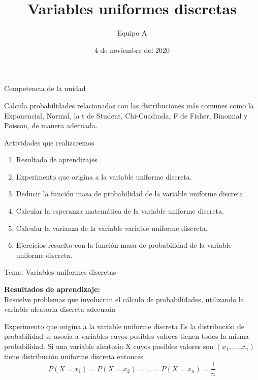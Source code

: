 \documentclass[11pt]{beamer}
\author{Equipo A}
\date{4 de noviembre del 2020}
\title{Variables uniformes discretas}
\institute{Universidad Autónoma de Yucatan}
\begin{document}
\begin{frame}
\titlepage
\end{frame}

\begin{frame}{Competencia de la unidad}
\begin{center}
Calcula probabilidades relacionadas con las distribuciones más comunes como la Exponencial, Normal, la t
de Student, Chi-Cuadrada, F de Fisher, Binomial y Poisson, de manera adecuada.
\end{center}
\end{frame}
\begin{frame}{Actividades que realizaremos}
\begin{enumerate}
\item Resultado de aprendizajes
\item Experimento que origina a la variable uniforme discreta.
\item Deducir la función masa de probabilidad de la variable uniforme discreta.
\item Calcular la esperanza matemática de la variable uniforme discreta.
\item Calcular la varianza de la variable variable uniforme discreta.
\item Ejercicios resuelto con la función masa de probabilidad de la variable uniforme discreta.
\end{enumerate}
\end{frame}

\begin{frame}{Tema: Variables uniformes discretas}
\begin{center}
\textbf{Resultados de aprendizaje:}\\
Resuelve problemas que involucran el cálculo de probabilidades, utilizando la variable aleatoria discreta adecuada
\end{center}
\end{frame}

\begin{frame}{Experimento que origina a la variable uniforme discreta}
Es la distribución de probabilidad se asocia a variables cuyos posibles valores tienen todos la misma probabilidad. Si una variable aleatoria X cuyos posibles valores son $({x_{1}, . . . ,x_{n}})$  
tiene distribución uniforme discreta entonces
$$
P(X=x_{1})=P(X=x_{2})=...=P(X=x_{n})={\dfrac{1}{n}}
$$
\end{frame} 
\end{document}
